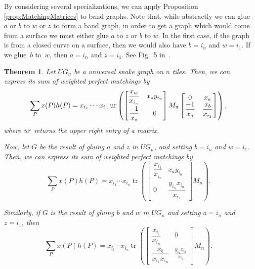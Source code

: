 \documentclass[11pt]{article}
\numberwithin{equation}{section}
\newtheorem{Theorem}{Theorem}[section]
\begin{document}
By considering several specializations, we can apply Proposition \ref{prop:MatchingMatrices} to band graphs. Note that, while abstractly we can glue $a$ or $b$ to $w$ or $z$ to form a band graph, in order to get a graph which would come from a surface we must either glue $a$ to $z$ or $b$ to $w$. In the first case, if the graph is from a closed curve on a surface, then we would also have $b = i_n$ and $w = i_1$. If we glue~$b$ to~$w$, then $a = i_n$ and $z = i_1$. See Fig.~5 in~\cite{MW}.

\begin{Theorem}\label{thm:upperright}
Let $UG_n$ be a universal snake graph on $n$ tiles. Then, we can express its sum of weighted perfect matchings by{\samepage \[
\sum_P x(P) h(P) = x_{i_1} \cdots x_{i_n} \operatorname{ur} \left( \begin{bmatrix} \dfrac{x_w}{x_{i_n}} & x_z y_{i_n} \vspace{1mm}\\ \dfrac{-1}{x_z} & 0 \end{bmatrix} M_n \begin{bmatrix} 0 & x_a \\ \dfrac{-1}{x_a} & \dfrac{x_b}{x_{i_1}} \end{bmatrix}\right),
\]
where $\emph{ur}$ returns the upper right entry of a matrix.}

Now, let $G$ be the result of gluing $a$ and $z$ in $UG_n$, and setting $b = i_n$ and $w = i_1$. Then, we can express its sum of weighted perfect matchings by\[
\sum_P x(P) h(P) = x_{i_1} \cdots x_{i_n} \operatorname{tr} \left( \begin{bmatrix} \dfrac{x_{i_1}}{x_{i_n}} & x_a y_{i_n} \\ 0 & \dfrac{y_{i_n} x_{i_n}}{x_{i_1}} \end{bmatrix} M_n \right).
\]

Similarly, if $G$ is the result of gluing $b$ and $w$ in $UG_n$ and setting $a = i_n$ and $z = i_1$, then
\[
\sum_P x(P) h(P) = x_{i_1} \cdots x_{i_n} \operatorname{tr} \left( \begin{bmatrix} \dfrac{x_{i_1}}{x_{i_n}} & 0 \\ \dfrac{x_b}{x_{i_1}x_{i_n}} & \frac{y_{i_n} x_{i_n}}{x_{i_1}} \end{bmatrix} M_n \right).
\]
\end{Theorem}
\end{document}
